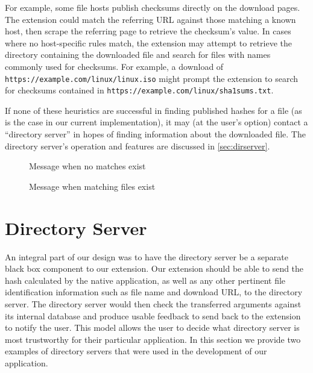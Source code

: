 \documentclass[letterpaper,twocolumn,10pt]{article}
\begin{document}
For example, some file hosts publish checksums directly on the download pages. The
extension could match the referring URL against those matching a known host, then
scrape the referring page to retrieve the checksum's value. In cases where no host-specific
rules match, the extension may attempt to retrieve the directory containing the
downloaded file and search for files with names commonly used for checksums. For
example, a download of \texttt{https://example.com/linux/linux.iso} might prompt the
extension to search for checksums contained in
\texttt{https://example.com/linux/sha1sums.txt}.

If none of these heuristics are successful in finding published hashes for a file (as is
the case in our current implementation), it may (at the user's option) contact
a ``directory server'' in hopes of finding information about the downloaded file.
The directory server's operation and features are discussed in \autoref{sec:dirserver}.

\begin{figure}
    \caption{Message when no matches exist}
    \label{fig:ss-none}
\end{figure}

\begin{figure}
    \caption{Message when matching files exist}
    \label{fig:ss-match}
\end{figure}

\section{Directory Server}
\label{sec:dirserver}

An integral part of our design was to have the directory server be a separate black box component to our extension. Our extension should be able to send the hash calculated by the native application, as well as any other pertinent file identification information such as file name and download URL, to the directory server. The directory server would then check the transferred arguments against its internal database and produce usable feedback to send back to the extension to notify the user. This model allows the user to decide what directory server is most trustworthy for their particular application. In this section we provide two examples of directory servers that were used in the development of our application.
\end{document}
